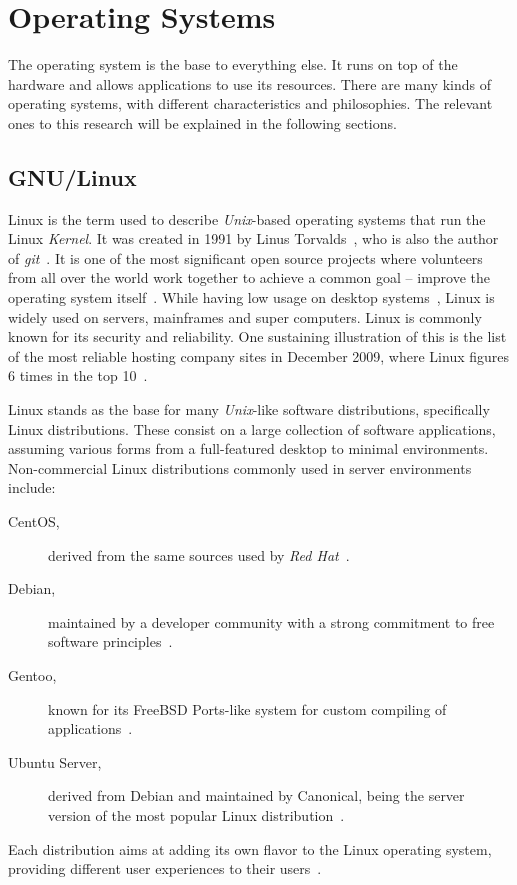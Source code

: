 \section{Operating Systems}
\label{tech:sec:operating_systems}
The operating system is the base to everything else. It runs on top of the hardware and allows applications to use its resources. There are many kinds of operating systems, with different characteristics and philosophies. The relevant ones to this research will be explained in the following sections.

\subsection{GNU/Linux}
Linux is the term used to describe \textit{Unix}-based operating systems that run the Linux \textit{Kernel}. It was created in 1991 by Linus Torvalds~\cite{ linux_kernel_evolution}, who is also the author of \textit{git}~\cite{pro_git}. It is one of the most significant open source projects where volunteers from all over the world work together to achieve a common goal – improve the operating system itself~\cite{ linux_kernel_evolution}. While having low usage on desktop systems~\cite{w3counter}, Linux is widely used on servers, mainframes and super computers. Linux is commonly known for its security and reliability. One sustaining illustration of this is the list of the most reliable hosting company sites in December 2009, where Linux figures 6 times in the top 10~\cite{netcraft_dec2009}.

Linux stands as the base for many \textit{Unix}-like software distributions, specifically Linux distributions. These consist on a large collection of software applications, assuming various forms from a full-featured desktop to minimal environments. Non-commercial Linux distributions commonly used in server environments include:
\begin {description}
\item[CentOS, ] derived from the same sources used by \textit{Red Hat}~\cite{centos}.
\item[Debian,] maintained by a developer community with a strong commitment to free software principles~\cite{debian}.
\item[Gentoo,] known for its FreeBSD Ports-like system for custom compiling of applications~\cite{gentoo}.
\item[Ubuntu Server,] derived from Debian and maintained by Canonical, being the server version of the most popular Linux distribution~\cite{ubuntu_server}.
\end{description}
Each distribution aims at adding its own flavor to the Linux operating system, providing different user experiences to their users~\cite{tuning_costumizing_linux}.


